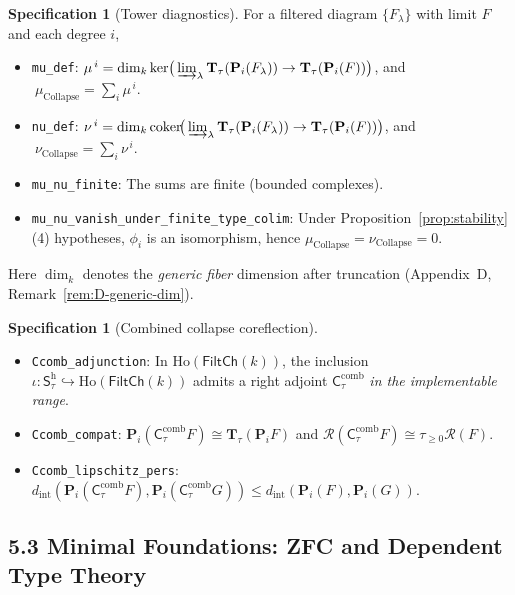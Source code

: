 \documentclass[11pt]{article}
\numberwithin{equation}{section}
\theoremstyle{definition}
\newtheorem{specification}[theorem]{Specification}
\DeclareRobustCommand{\muc}{\mu_{\mathrm{Collapse}}}
\DeclareRobustCommand{\nuc}{\nu_{\mathrm{Collapse}}}
\begin{document}
\begin{specification}[Tower diagnostics]\label{spec:mu-nu}
For a filtered diagram $\{F_\lambda\}$ with limit $F$ and each degree $i$,
\begin{itemize}
  \item \texttt{mu\_def}: $\mu^{\,i}=\dim_k\ker\!\big(\varinjlim_\lambda \mathbf{T}_\tau(\mathbf{P}_i(F_\lambda))\to \mathbf{T}_\tau(\mathbf{P}_i(F))\big)$, and $\ \muc=\sum_i \mu^{\,i}$.
  \item \texttt{nu\_def}: $\nu^{\,i}=\dim_k\mathrm{coker}\!\big(\varinjlim_\lambda \mathbf{T}_\tau(\mathbf{P}_i(F_\lambda))\to \mathbf{T}_\tau(\mathbf{P}_i(F))\big)$, and $\ \nuc=\sum_i \nu^{\,i}$.
  \item \texttt{mu\_nu\_finite}: The sums are finite (bounded complexes).
  \item \texttt{mu\_nu\_vanish\_under\_finite\_type\_colim}: Under Proposition~\ref{prop:stability}(4) hypotheses, $\phi_i$ is an isomorphism, hence $\muc=\nuc=0$.
\end{itemize}
Here $\dim_k$ denotes the \emph{generic fiber} dimension after truncation (Appendix~D, Remark~\ref{rem:D-generic-dim}).
\end{specification}

\begin{specification}[Combined collapse coreflection]\label{spec:combined}
\begin{itemize}
  \item \texttt{Ccomb\_adjunction}: In $\mathrm{Ho}(\mathsf{FiltCh}(k))$, the inclusion $\iota:\mathsf{S}_\tau^{\mathrm{h}}\hookrightarrow \mathrm{Ho}(\mathsf{FiltCh}(k))$ admits a right adjoint $\mathsf{C}_\tau^{\mathrm{comb}}$ \emph{in the implementable range}.
  \item \texttt{Ccomb\_compat}: $\mathbf{P}_i(\mathsf{C}_\tau^{\mathrm{comb}}F)\cong \mathbf{T}_\tau(\mathbf{P}_iF)$ and $\mathcal{R}(\mathsf{C}_\tau^{\mathrm{comb}}F)\cong \tau_{\ge 0}\mathcal{R}(F)$.
  \item \texttt{Ccomb\_lipschitz\_pers}: $d_{\mathrm{int}}(\mathbf{P}_i(\mathsf{C}_\tau^{\mathrm{comb}}F),\mathbf{P}_i(\mathsf{C}_\tau^{\mathrm{comb}}G))\le d_{\mathrm{int}}(\mathbf{P}_i(F),\mathbf{P}_i(G))$.
\end{itemize}
\end{specification}

\subsection*{5.3 Minimal Foundations: ZFC and Dependent Type Theory}
\end{document}
